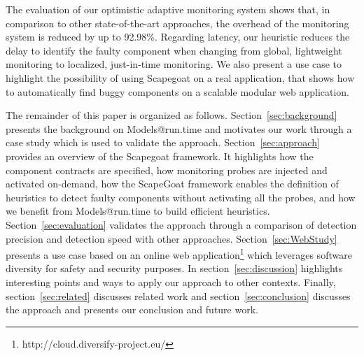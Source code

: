 The evaluation of our optimistic adaptive monitoring system shows that, in comparison to other state-of-the-art approaches, the overhead of the monitoring system is reduced by up to 92.98\%.
Regarding latency, our heuristic reduces the delay to identify the faulty component when changing from global, lightweight monitoring to localized, just-in-time monitoring.
We also present a use case to highlight the possibility of using Scapegoat on a real application, that shows how to automatically find buggy components on a scalable modular web application.

The remainder of this paper is organized as follows.
Section~\ref{sec:background} presents the background on Models@run.time and motivates our work through a case study which is used to validate the approach.
Section~\ref{sec:approach} provides an overview of the Scapegoat framework.
It highlights how the component contracts are specified, how monitoring probes are injected and activated on-demand, how the ScapeGoat framework enables the definition of heuristics to detect faulty components without activating all the probes, and how we benefit from Models@run.time to build efficient heuristics.
Section~\ref{sec:evaluation} validates the approach through a comparison of detection precision and detection speed with other approaches.
Section~\ref{sec:WebStudy} presents a use case based on an online web application\footnote{http://cloud.diversify-project.eu/} which leverages software diversity for safety and security purposes.
In section~\ref{sec:discussion} highlights interesting points and ways to apply our approach to other contexts.
Finally, section~\ref{sec:related} discusses related work and section~\ref{sec:conclusion} discusses the approach and presents our conclusion and future work.





